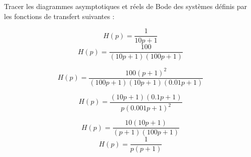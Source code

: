 %    
%    
%    
Tracer les diagrammes asymptotiques et réels de Bode des systèmes définis
par les fonctions de transfert suivantes :

\question{}
\[
H(p) = \dfrac{1}{10p+1}
\]
\question{}
\[
H(p) = \dfrac{100}{(10p+1)(100p+1)}
\]

\question{}
\[
H(p) = \dfrac{100(p+1)^2}{(100p+1)(10p+1)(0.01p+1)}
\]

\question{}
\[
H(p) = \dfrac{(10p+1)(0.1p+1)}{p(0.001p+1)^2}
\]

\question{}
\[
H(p) = \dfrac{10(10p+1)}{(p+1)(100p+1)}
\]
\[
    H(p)=\dfrac{1}{p(p+1)}
\]
